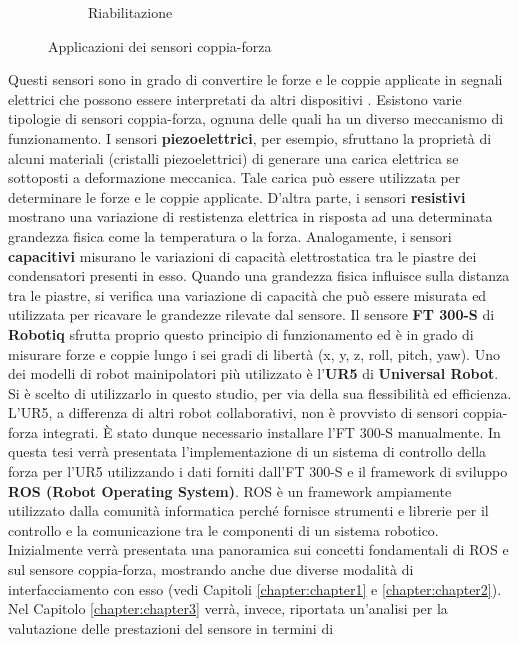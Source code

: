 \begin{figure}[H]
\begin{subfigure}[b]{0.33\textwidth}
        \caption{Riabilitazione}
        \label{fig:rehab}
    \end{subfigure}
    \caption{Applicazioni dei sensori coppia-forza}\label{fig:industrial_applications}
\end{figure}
Questi sensori sono in grado di convertire le forze e le coppie applicate in segnali elettrici che possono essere 
interpretati da altri dispositivi \cite{cao2021six}. 
Esistono varie tipologie di sensori coppia-forza, ognuna delle quali ha un diverso meccanismo di funzionamento. 
I sensori \textbf{piezoelettrici}, per esempio, sfruttano la propriet\`{a} di alcuni materiali (cristalli piezoelettrici) di generare 
una carica elettrica se sottoposti a deformazione meccanica. Tale carica pu\`{o} essere utilizzata per determinare le forze e le coppie 
applicate. 
D'altra parte, i sensori \textbf{resistivi} mostrano una variazione di restistenza elettrica in risposta ad 
una determinata grandezza fisica come la temperatura o la forza.
Analogamente, i sensori \textbf{capacitivi} misurano le variazioni di capacit\`{a} elettrostatica tra le piastre dei condensatori 
presenti in esso. Quando una grandezza fisica influisce sulla distanza tra le piastre, si verifica una variazione di capacit\`{a} 
che pu\`{o} essere misurata ed utilizzata per ricavare le grandezze rilevate dal sensore.
Il sensore \textbf{FT 300-S} di \textbf{Robotiq} sfrutta proprio questo principio di funzionamento ed \`{e} in grado di misurare 
forze e coppie lungo i sei gradi di libert\`{a} (x, y, z, roll, pitch, yaw). 
Uno dei modelli di robot mainipolatori pi\`{u} utilizzato \`{e} l'\textbf{UR5} di \textbf{Universal Robot}. Si \`{e} scelto di 
utilizzarlo in questo studio, per via della sua flessibilit\`{a} ed efficienza. 
L'UR5, a differenza di altri robot collaborativi, non \`{e} provvisto di sensori coppia-forza integrati. \`{E} stato dunque necessario 
installare l'FT 300-S manualmente. 
In questa tesi verr\`{a} presentata l'implementazione di un sistema di controllo della forza per l'UR5 utilizzando i dati
forniti dall'FT 300-S e il framework di sviluppo \textbf{ROS (Robot Operating System)}.
ROS \`{e} un framework ampiamente utilizzato dalla comunit\`{a} informatica perch\'{e} fornisce strumenti e librerie 
per il controllo e la comunicazione tra le componenti di un sistema robotico. 
Inizialmente verr\`{a} presentata una panoramica 
sui concetti fondamentali di ROS e sul sensore coppia-forza, mostrando anche due diverse modalit\`{a} di interfacciamento con esso 
(vedi Capitoli \ref{chapter:chapter1} e \ref{chapter:chapter2}).
Nel Capitolo \ref{chapter:chapter3} verr\`{a}, invece, riportata un'analisi per la valutazione delle prestazioni del sensore in termini di 
